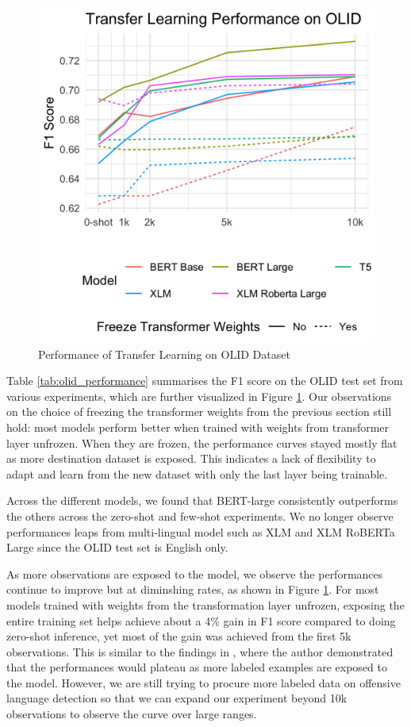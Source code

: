 \documentclass[11pt,a4paper]{article}
\begin{document}
\begin{figure}[h]
\includegraphics[width=\columnwidth]{transfer_learning_performance_nominal.png}
\centering
\caption{Performance of Transfer Learning on OLID Dataset}\label{fig:olid_performance_fig}
\end{figure}

Table \ref{tab:olid_performance} summarises the F1 score on the OLID test set from various experiments, which are further visualized in Figure \ref{fig:olid_performance_fig}. Our observations on the choice of freezing the transformer weights from the previous section still hold: most models perform better when trained with weights from transformer layer unfrozen. When they are frozen, the performance curves stayed mostly flat as more destination dataset is exposed. This indicates a lack of flexibility to adapt and learn from the new dataset with only the last layer being trainable.  

Across the different models, we found that BERT-large consistently outperforms the others across the zero-shot and few-shot experiments. We no longer observe performances leaps from multi-lingual model such as XLM and XLM RoBERTa Large since the OLID test set is English only. 

As more observations are exposed to the model, we observe the performances continue to improve but at diminshing rates, as shown in Figure \ref{fig:olid_performance_fig}. For most models trained with weights from the transformation layer unfrozen, exposing the entire training set helps achieve about a 4\% gain in F1 score compared to doing zero-shot inference, yet most of the gain was achieved from the first 5k observations. This is similar to the findings in \citep{cer2018universal}, where the author demonstrated that the performances would plateau as more labeled examples are exposed to the model. However, we are still trying to procure more labeled data on offensive language detection so that we can expand our experiment beyond 10k observations to observe the curve over large ranges.  
\end{document}
